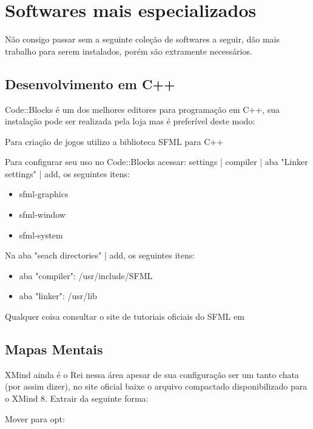 \documentclass[a4paper,11pt]{article}
\begin{document}
\section{Softwares mais especializados}
Não consigo passar sem a seguinte coleção de softwares a seguir, dão mais trabalho para serem instalados, porém são extramente necessários.

\subsection{Desenvolvimento em C++}
Code::Blocks é um dos melhores editores para programação em C++, sua instalação pode ser realizada pela loja mas é preferível deste modo: \\

Para criação de jogos utilizo a biblioteca SFML para C++ \\

Para configurar seu uso no Code::Blocks acessar: settings | compiler | aba "Linker settings" | add, os seguintes itens:
\begin{itemize}[noitemsep]
  \item sfml-graphics
  \item sfml-window
  \item sfml-system
\end{itemize}

Na aba "seach directories" | add, os seguintes itens:
\begin{itemize}[noitemsep]
  \item aba "compiler": /usr/include/SFML
  \item aba "linker": /usr/lib
\end{itemize}

Qualquer coisa consultar o site de tutoriais oficiais do SFML em \cite{sfml}

\subsection{Mapas Mentais}
XMind ainda é o Rei nessa área apesar de sua configuração ser um tanto chata (por assim dizer), no site oficial \cite{xmind} baixe o arquivo compactado disponibilizado para o XMind 8. Extrair da seguinte forma: \\

Mover para opt: \\
\end{document}
